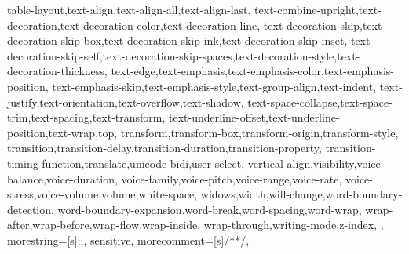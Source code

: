 {{      table-layout,text-align,text-align-all,text-align-last,
      text-combine-upright,text-decoration,text-decoration-color,text-decoration-line,
      text-decoration-skip,text-decoration-skip-box,text-decoration-skip-ink,text-decoration-skip-inset,
      text-decoration-skip-self,text-decoration-skip-spaces,text-decoration-style,text-decoration-thickness,
      text-edge,text-emphasis,text-emphasis-color,text-emphasis-position,
      text-emphasis-skip,text-emphasis-style,text-group-align,text-indent,
      text-justify,text-orientation,text-overflow,text-shadow,
      text-space-collapse,text-space-trim,text-spacing,text-transform,
      text-underline-offset,text-underline-position,text-wrap,top,
      transform,transform-box,transform-origin,transform-style,
      transition,transition-delay,transition-duration,transition-property,
      transition-timing-function,translate,unicode-bidi,user-select,
      vertical-align,visibility,voice-balance,voice-duration,
      voice-family,voice-pitch,voice-range,voice-rate,
      voice-stress,voice-volume,volume,white-space,
      widows,width,will-change,word-boundary-detection,
      word-boundary-expansion,word-break,word-spacing,word-wrap,
      wrap-after,wrap-before,wrap-flow,wrap-inside,
      wrap-through,writing-mode,z-index,
    },
  morestring=[s]{:}{;},
  sensitive,
  morecomment=[s]{/*}{*/},
}
